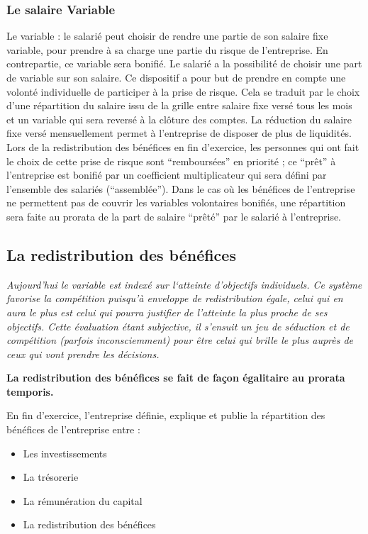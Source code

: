 \documentclass[12pt]{article}
\newcommand{\actuel}[1]{%
  \begin{tcolorbox}[colframe=DarkButter,boxrule=2pt,arc=4pt,left=6pt,right=6pt,top=6pt,bottom=6pt,boxsep=0pt,colback=Aluminium2]
    \textit{#1}
  \end{tcolorbox}
}
\newcommand{\regle}[1]{%
  \begin{tcolorbox}[colframe=DarkOrange,boxrule=2pt,arc=4pt,left=6pt,right=6pt,top=6pt,bottom=6pt,boxsep=0pt,colback=LightOrange]
  \textbf{#1}
  \end{tcolorbox}
}
\begin{document}
 \subsubsection{Le salaire Variable}
 Le variable : le salarié peut choisir de rendre une partie de son salaire fixe variable, pour prendre à sa charge une partie du risque de l’entreprise. En contrepartie, ce variable sera bonifié. 
 Le salarié a la possibilité de choisir une part de variable sur son salaire. Ce dispositif a pour but de prendre en compte une volonté individuelle de participer à la prise de risque. Cela se traduit par le choix d’une répartition du salaire issu de la grille entre salaire fixe versé tous les mois et un variable qui sera reversé à la clôture des comptes. 
 La réduction du salaire fixe versé mensuellement permet à l’entreprise de disposer de plus de liquidités. Lors de la redistribution des bénéfices en fin d’exercice, les personnes qui ont fait le choix de cette prise de risque sont “remboursées” en priorité ; ce “prêt” à l’entreprise est bonifié par un coefficient multiplicateur qui sera défini par l’ensemble des salariés (“assemblée”). Dans le cas où les bénéfices de l’entreprise ne permettent pas de couvrir les variables volontaires bonifiés, une répartition sera faite au prorata de la part de salaire “prêté” par le salarié à l’entreprise.

\subsection{La redistribution des bénéfices}
\actuel{Aujourd’hui le variable est indexé sur l‘atteinte d’objectifs individuels. Ce système favorise la compétition puisqu’à enveloppe de redistribution égale, celui qui en aura le plus est celui qui pourra justifier de l’atteinte la plus proche de ses objectifs. Cette évaluation étant subjective, il s'ensuit un jeu de séduction et de compétition (parfois inconsciemment) pour être celui qui brille le plus auprès de ceux qui vont prendre les décisions.}

\regle{La redistribution des bénéfices se fait de façon égalitaire au prorata temporis.}
 
 En fin d’exercice, l’entreprise définie, explique et publie la répartition des bénéfices de l’entreprise entre :
 \begin{itemize}
   \item Les investissements
   \item La trésorerie
   \item La rémunération du capital
   \item La redistribution des bénéfices
 \end{itemize}
\end{document}

